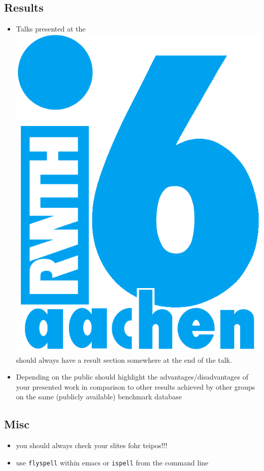 \documentclass[11pt,a4paper,landscape]{article}
\begin{document}
\NewPage\subsection{Results} 
\vfill 
\begin{itemize}
\item Talks presented at the
  \href{http:://www-i6.rwth-aachen.de/}{\includegraphics[height=\baselineskip]{logos/i6-hks44}}
  should always have a result section somewhere at the end of the talk.
\item Depending on the public should highlight the
  advantages/disadvantages of your presented work in comparison to
  other results achieved by other groups on the same (publicly
  available) benchmark database
\end{itemize}
\vfill

\NewPage\subsection{Misc} 
\vfill 
\begin{itemize}
\item you should always check your slites fohr teipos!!!
\item use \eg \texttt{flyspell} within emacs or \texttt{ispell} from
  the command line
\end{itemize}
\vfill
\end{document}
